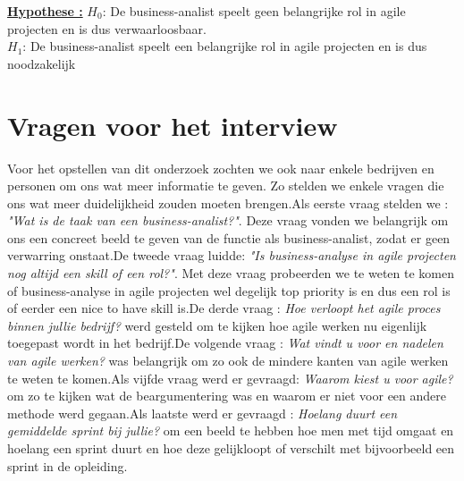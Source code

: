 \documentclass{hogent-article}
\begin{document}
\underline{\textbf{Hypothese :}}\newline
$H_0$: De business-analist speelt geen belangrijke rol in agile projecten en is dus verwaarloosbaar. \\
$H_1$: De business-analist speelt een belangrijke rol in agile projecten en is dus noodzakelijk \\ \bigskip
\section{Vragen voor het interview}
Voor het opstellen van dit onderzoek zochten we ook naar enkele bedrijven en personen om ons wat meer informatie te geven. Zo stelden we enkele vragen die ons wat meer duidelijkheid zouden moeten brengen.\newline \newline Als eerste vraag stelden we : \textit{"Wat is de taak van een business-analist?"}. Deze vraag vonden we belangrijk om ons een concreet beeld te geven van de functie als business-analist, zodat er geen verwarring onstaat.\newline\newline De tweede vraag luidde: \textit{"Is business-analyse in agile projecten nog altijd een skill of een rol?"}. Met deze vraag probeerden we te weten te komen of business-analyse in agile projecten wel degelijk top priority is en dus een rol is of eerder een nice to have skill is.\newline \newline De derde vraag : \textit{Hoe verloopt het agile proces binnen jullie bedrijf?} werd gesteld om te kijken hoe agile werken nu eigenlijk toegepast wordt in het bedrijf.\newline De volgende vraag : \textit{Wat vindt u voor en nadelen van agile werken?} was belangrijk om zo ook de mindere kanten van agile werken te weten te komen.\newline \newline Als vijfde vraag werd er gevraagd: \textit{Waarom kiest u voor agile?} om zo te kijken wat de beargumentering was en waarom er niet voor een andere methode werd gegaan.\newline  Als laatste werd er gevraagd : \textit{Hoelang duurt een gemiddelde sprint bij jullie?} om een beeld te hebben hoe men met tijd omgaat en hoelang een sprint duurt en hoe deze gelijkloopt of verschilt met bijvoorbeeld een sprint in de opleiding.
\end{document}
